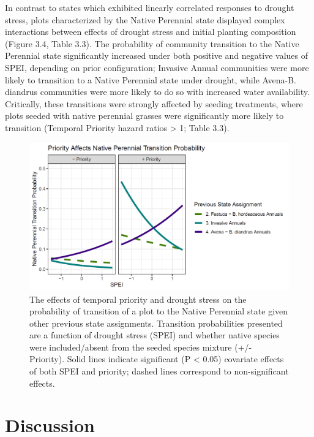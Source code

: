\documentclass[twoside,12pt,final]{ucthesis-CA2012}
\begin{document}
\begin{ucmainmatter}
\begin{table}[ht]
\end{table}
In contrast to states which exhibited linearly correlated responses to drought stress, plots characterized by the Native Perennial state displayed complex interactions between effects of drought stress and initial planting composition (Figure 3.4, Table 3.3).
The probability of community transition to the Native Perennial state significantly increased under both positive and negative values of SPEI, depending on prior configuration; Invasive Annual communities were more likely to transition to a Native Perennial state under drought, while Avena-B. diandrus communities were more likely to do so with increased water availability.
Critically, these transitions were strongly affected by seeding treatments, where plots seeded with native perennial grasses were significantly more likely to transition (Temporal Priority hazard ratios \textgreater{} 1; Table 3.3).
\begin{figure}
\centering
\includegraphics[width=\textwidth,height=0.4\textheight]{figure/Fig3_4.png}
\caption{The effects of temporal priority and drought stress on the probability of transition of a plot to the Native Perennial state given other previous state assignments. Transition probabilities presented are a function of drought stress (SPEI) and whether native species were included/absent from the seeded species mixture (+/- Priority). Solid lines indicate significant (P \textless{} 0.05) covariate effects of both SPEI and priority; dashed lines correspond to non-significant effects. \label{fig-3-4}}
\end{figure}
\hypertarget{discussion}{%
\section{Discussion}\label{discussion}}


\end{ucmainmatter}
\end{document}
